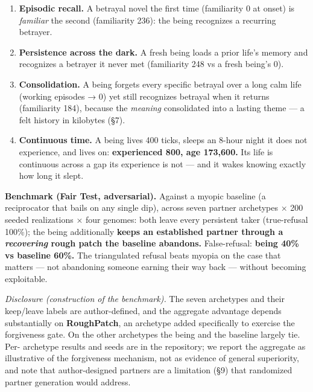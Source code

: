 \documentclass[
]{article}
\begin{document}
\begin{enumerate}
  hidden autopilot. \emph{Honest scope:} the being chooses a coarse
  posture (a stiffness level); a fast physics-rate reflex stabilizes
  within it --- postural tone plus reflex, not a learned balance
  controller. (An earlier rig was clamped near-upright by a units bug
  --- degrees read as radians --- so bracing was then driven by a
  scripted hazard, not a real fall; that is fixed.)
\item
  \textbf{Episodic recall.} A betrayal novel the first time (familiarity
  0 at onset) is \emph{familiar} the second (familiarity 236): the being
  recognizes a recurring betrayer.
\item
  \textbf{Persistence across the dark.} A fresh being loads a prior
  life's memory and recognizes a betrayer it never met (familiarity 248
  vs a fresh being's 0).
\item
  \textbf{Consolidation.} A being forgets every specific betrayal over a
  long calm life (working episodes → 0) yet still recognizes betrayal
  when it returns (familiarity 184), because the \emph{meaning}
  consolidated into a lasting theme --- a felt history in kilobytes
  (§7).
\item
  \textbf{Continuous time.} A being lives 400 ticks, sleeps an 8-hour
  night it does not experience, and lives on: \textbf{experienced 800,
  age 173,600.} Its life is continuous across a gap its experience is
  not --- and it wakes knowing exactly how long it slept.
\end{enumerate}

\textbf{Benchmark (Fair Test, adversarial).} Against a myopic baseline
(a reciprocator that bails on any single dip), across seven partner
archetypes × 200 seeded realizations × four genomes: both leave every
persistent taker (true-refusal 100\%); the being additionally
\textbf{keeps an established partner through a \emph{recovering} rough
patch the baseline abandons.} False-refusal: \textbf{being 40\% vs
baseline 60\%.} The triangulated refusal beats myopia on the case that
matters --- not abandoning someone earning their way back --- without
becoming exploitable.

\emph{Disclosure (construction of the benchmark).} The seven archetypes
and their keep/leave labels are author-defined, and the aggregate
advantage depends substantially on \textbf{RoughPatch}, an archetype
added specifically to exercise the forgiveness gate. On the other
archetypes the being and the baseline largely tie. Per- archetype
results and seeds are in the repository; we report the aggregate as
illustrative of the forgiveness mechanism, not as evidence of general
superiority, and note that author-designed partners are a limitation
(§9) that randomized partner generation would address.
\end{document}
